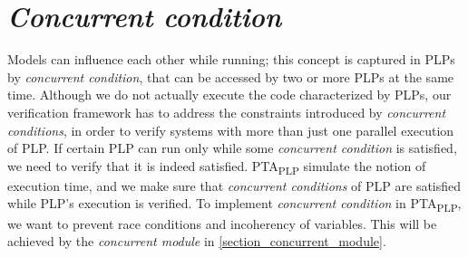 \section{\textit{Concurrent condition} \label{plp_to_pta_concurrent_condition}}
Models can influence each other while running; this concept is captured in PLPs by \textit{concurrent condition}, that can be accessed by two or more PLPs at the same time. Although we do not actually execute the code characterized by PLPs, our verification framework has to address the constraints introduced by \textit{concurrent conditions}, in order to verify systems with more than just one parallel execution of PLP. If certain PLP can run only while some \textit{concurrent condition} is satisfied, we need to verify that it is indeed satisfied. PTA\textsubscript{PLP} simulate the notion of execution time, and we make sure that \textit{concurrent conditions} of PLP are satisfied while PLP’s execution is verified. To implement \textit{concurrent condition} in PTA\textsubscript{PLP}, we want to prevent race conditions and incoherency of variables. This will be achieved by the \textit{concurrent module} in \ref{section_concurrent_module}. \\

